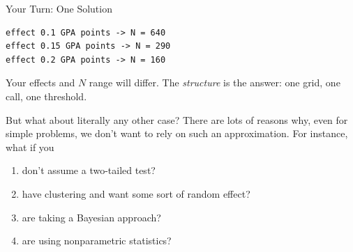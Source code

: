 \documentclass[
  ignorenonframetext,
  aspectratio=169,
]{beamer}
\newenvironment{Shaded}{\begin{snugshade}}{\end{snugshade}}
\newcommand{\AttributeTok}[1]{\textcolor[rgb]{0.40,0.45,0.13}{#1}}
\newcommand{\ControlFlowTok}[1]{\textcolor[rgb]{0.00,0.23,0.31}{#1}}
\newcommand{\DecValTok}[1]{\textcolor[rgb]{0.68,0.00,0.00}{#1}}
\newcommand{\FloatTok}[1]{\textcolor[rgb]{0.68,0.00,0.00}{#1}}
\newcommand{\FunctionTok}[1]{\textcolor[rgb]{0.28,0.35,0.67}{#1}}
\newcommand{\NormalTok}[1]{\textcolor[rgb]{0.00,0.23,0.31}{#1}}
\newcommand{\OtherTok}[1]{\textcolor[rgb]{0.00,0.23,0.31}{#1}}
\newcommand{\SpecialCharTok}[1]{\textcolor[rgb]{0.37,0.37,0.37}{#1}}
\newcommand{\StringTok}[1]{\textcolor[rgb]{0.13,0.47,0.30}{#1}}
\providecommand{\tightlist}{%
  \setlength{\itemsep}{0pt}\setlength{\parskip}{0pt}}\usepackage{longtable,booktabs,array}
\begin{document}
\begin{frame}[fragile]{Your Turn: One Solution}
\label{your-turn-one-solution}
\begin{Shaded}
\end{Shaded}

\begin{verbatim}
effect 0.1 GPA points -> N = 640 
effect 0.15 GPA points -> N = 290 
effect 0.2 GPA points -> N = 160 
\end{verbatim}

\footnotesize Your effects and \(N\) range will differ. The
\emph{structure} is the answer: one grid, one call, one threshold.
\end{frame}

\begin{frame}{But what about literally any other case?}
\label{but-what-about-literally-any-other-case}
There are lots of reasons why, even for simple problems, we don't want
to rely on such an approximation. For instance, what if you

\begin{enumerate}
\tightlist
\item
  don't assume a two-tailed test?
\item
  have clustering and want some sort of random effect?
\item
  are taking a Bayesian approach?
\item
  are using nonparametric statistics?
\end{enumerate}
\end{frame}
\end{document}
